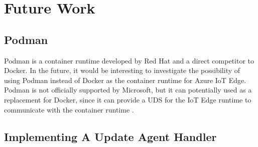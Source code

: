 \section{Future Work}

\subsection{Podman}
Podman is a container runtime developed by Red Hat and a direct competitor to Docker.
In the future, it would be interesting to investigate the possibility of using
Podman instead of Docker as the container runtime for Azure IoT Edge. Podman is
not officially supported by Microsoft, but it can potentially used as a
replacement for Docker, since it can provide a \ac{UDS} for the IoT Edge runtime
to communicate with the container runtime \cite{book:3556946,msdoc-supportetplatforms}.

\subsection{Implementing A Update Agent Handler}

